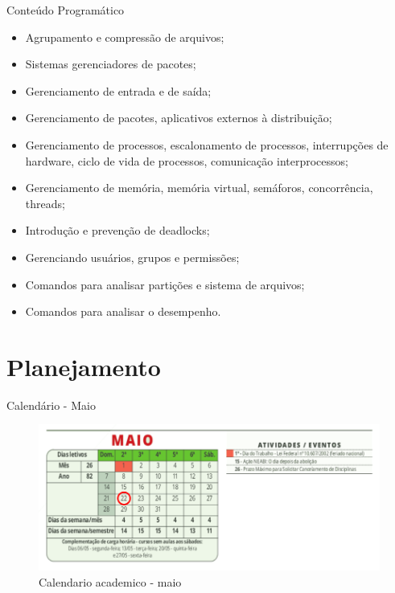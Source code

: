 \documentclass{beamer}
\begin{document}
\begin{frame}[fragile]{Conteúdo Programático}

      \begin{itemize}
            \item Agrupamento e compressão de arquivos;
            \item Sistemas gerenciadores de pacotes;
            \item Gerenciamento de entrada e de saída;
            \item Gerenciamento de pacotes, aplicativos externos à distribuição;
            \item Gerenciamento de processos, escalonamento de processos, interrupções de
            hardware, ciclo de vida de processos, comunicação interprocessos;
            \item Gerenciamento de memória, memória virtual, semáforos, concorrência, threads;
            \item Introdução e prevenção de deadlocks;
            \item Gerenciando usuários, grupos e permissões;
            \item Comandos para analisar partições e sistema de arquivos;
            \item Comandos para analisar o desempenho.
      \end{itemize}
      \end{frame}
      



\section{Planejamento}

\begin{frame}[fragile]{Calendário - Maio}
      \begin{figure}[H]
            \centerline{\includegraphics[width=1.1\textwidth]{assets/aula-tads-sopa2-2023-05-22/maio.png}}
            \caption{Calendario academico - maio}
        \end{figure}
\end{frame}
\end{document}
